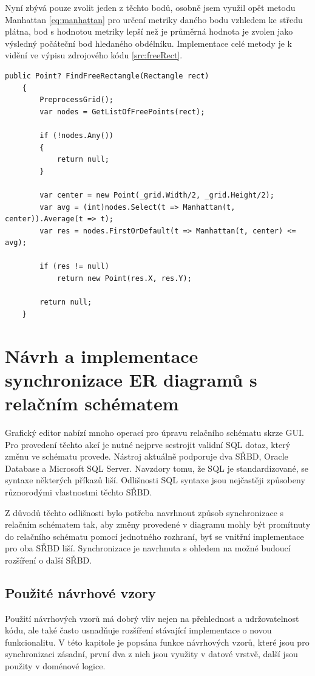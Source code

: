 \documentclass[czech,bachelor,public,dept460,male,oneside]{diploma}
\begin{document}
	Nyní zbývá pouze zvolit jeden z těchto bodů, osobně jsem využil opět metodu Manhattan \ref{eq:manhattan} pro určení metriky daného bodu vzhledem ke středu plátna, bod s hodnotou metriky lepší než je průměrná hodnota je zvolen jako výsledný počáteční bod hledaného obdélníku. Implementace celé metody je k vidění ve výpisu zdrojového kódu \ref{src:freeRect}.
	
	\begin{lstlisting}[label=src:freeRect,caption=Nalezení volného obdélníku v mřížce]
	public Point? FindFreeRectangle(Rectangle rect)
	{
		PreprocessGrid();
		var nodes = GetListOfFreePoints(rect);
		
		if (!nodes.Any())
		{
			return null;
		}
		
		var center = new Point(_grid.Width/2, _grid.Height/2);
		var avg = (int)nodes.Select(t => Manhattan(t, center)).Average(t => t);
		var res = nodes.FirstOrDefault(t => Manhattan(t, center) <= avg);
		
		if (res != null) 
			return new Point(res.X, res.Y);
		
		return null;
	}
	\end{lstlisting}
		
\newpage
\section{Návrh a implementace synchronizace ER diagramů s relačním schématem}
Grafický editor nabízí mnoho operací pro úpravu relačního schématu skrze GUI. Pro provedení těchto akcí je nutné nejprve sestrojit validní SQL dotaz, který změnu ve schématu provede. Nástroj aktuálně podporuje dva SŘBD, Oracle Database a Microsoft SQL Server. Navzdory tomu, že SQL je standardizované, se syntaxe některých příkazů liší. Odlišnosti SQL syntaxe jsou nejčastěji způsobeny různorodými vlastnostmi těchto SŘBD. 

Z důvodů těchto odlišnosti bylo potřeba navrhnout způsob synchronizace s relačním schématem tak, aby změny provedené v diagramu mohly být promítnuty do relačního schématu pomocí jednotného rozhraní, byť se vnitřní implementace pro oba SŘBD liší. Synchronizace je navrhnuta s ohledem na možné budoucí rozšíření o další SŘBD.
	
	\subsection{Použité návrhové vzory}
	Použití návrhových vzorů má dobrý vliv nejen na přehlednost a udržovatelnost kódu, ale také často usnadňuje rozšíření stávající implementace o novou funkcionalitu.  V této kapitole je popsána funkce návrhových vzorů, které jsou pro synchronizaci zásadní, první dva z nich jsou využity v datové vrstvě, další jsou použity v doménové logice.
	
\end{document}
